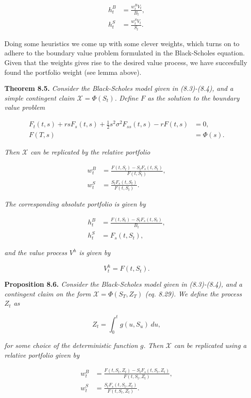 \documentclass[
]{article}
\begin{document}
\begin{align*}
h_t^B&=\frac{w_t^B V_t}{B_t},\tag{8.6}\\
h_t^S&=\frac{w_t^S V_t}{S_t}.\tag{8.7}
\end{align*}

Doing some heuristics we come up with some clever weights, which turns
on to adhere to the boundary value problem formulated in the
Black-Scholes equation. Given that the weights gives rise to the desired
value process, we have succesfully found the portfolio weight (see lemma
above).

\textbf{Theorem 8.5.} \emph{Consider the Black-Scholes model given in
(8.3)-(8.4), and a simple contingent claim \(\mathcal{X}=\Phi(S_t)\).
Define \(F\) as the solution to the boundary value problem}

\begin{align*}
F_t(t,s)+rsF_s(t,s)+\frac{1}{2}s^2\sigma^2F_{ss}(t,s)-rF(t,s)&=0,\tag{8.17}\\
F(T,s)&=\Phi(s).\tag{8.17}
\end{align*}

\emph{Then \(\mathcal{X}\) can be replicated by the relative portfolio}

\begin{align*}
w_t^B&=\frac{F(t,S_t)-S_tF_s(t,S_t)}{F(t,S_t)},\tag{8.18}\\
w_t^S&=\frac{S_tF_s(t,S_t)}{F(t,S_t)}.\tag{8.19}
\end{align*}

\emph{The corresponding absolute portfolio is given by}

\begin{align*}
h_t^B&=\frac{F(t,S_t)-S_tF_s(t,S_t)}{B_t},\tag{8.20}\\
h_t^S&=F_s(t,S_t),\tag{8.21}
\end{align*}

\emph{and the value process \(V^h\) is given by}

\[
V^h_t=F(t,S_t).\tag{8.22}
\]

\textbf{Proposition 8.6.} \emph{Consider the Black-Scholes model given
in (8.3)-(8.4), and a contingent claim on the form
\(\mathcal{X}=\Phi(S_T,Z_T)\) (eq. 8.29). We define the process \(Z_t\)
as}

\[
Z_t=\int_0^tg(u,S_u)\ du,\tag{8.30}
\]

\emph{for some choice of the deterministic function \(g\). Then
\(\mathcal{X}\) can be replicated using a relative portfolio given by}

\begin{align*}
w_t^B&=\frac{F(t,S_t,Z_t)-S_tF_s(t,S_t,Z_t)}{F(t,S_t,Z_t)},\tag{8.31}\\
w_t^S&=\frac{S_tF_s(t,S_t,Z_t)}{F(t,S_t,Z_t)}.\tag{8.32}
\end{align*}
\end{document}
